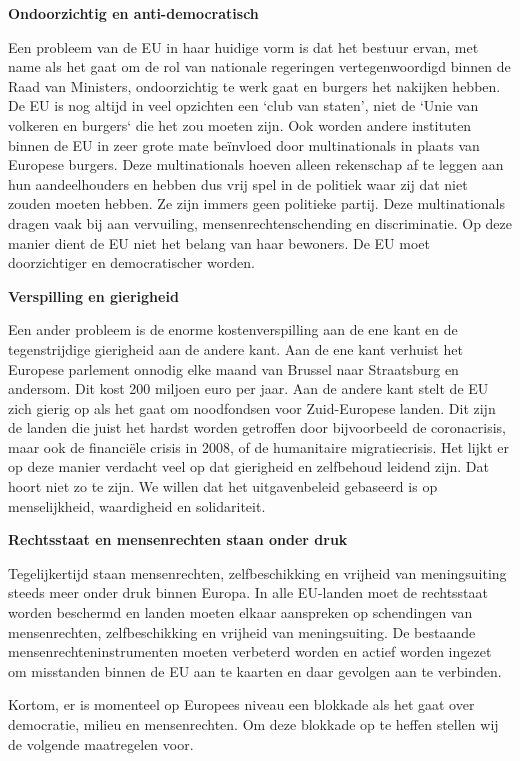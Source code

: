 \textbf{Ondoorzichtig en anti-democratisch}

Een probleem van de EU in haar huidige vorm is dat het bestuur ervan,
met name als het gaat om de rol van nationale regeringen
vertegenwoordigd binnen de Raad van Ministers, ondoorzichtig te werk
gaat en burgers het nakijken hebben. De EU is nog altijd in veel
opzichten een `club van staten', niet de `Unie van volkeren en burgers`
die het zou moeten zijn. Ook worden andere instituten binnen de EU in
zeer grote mate beïnvloed door multinationals in plaats van Europese
burgers. Deze multinationals hoeven alleen rekenschap af te leggen aan
hun aandeelhouders en hebben dus vrij spel in de politiek waar zij dat
niet zouden moeten hebben. Ze zijn immers geen politieke partij. Deze
multinationals dragen vaak bij aan vervuiling, mensenrechtenschending en
discriminatie. Op deze manier dient de EU niet het belang van haar
bewoners. De EU moet doorzichtiger en democratischer worden.

\textbf{Verspilling en gierigheid}

Een ander probleem is de enorme kostenverspilling aan de ene kant en de
tegenstrijdige gierigheid aan de andere kant. Aan de ene kant verhuist
het Europese parlement onnodig elke maand van Brussel naar Straatsburg
en andersom. Dit kost 200 miljoen euro per jaar. Aan de andere kant
stelt de EU zich gierig op als het gaat om noodfondsen voor
Zuid-Europese landen. Dit zijn de landen die juist het hardst worden
getroffen door bijvoorbeeld de coronacrisis, maar ook de financiële
crisis in 2008, of de humanitaire migratiecrisis. Het lijkt er op deze
manier verdacht veel op dat gierigheid en zelfbehoud leidend zijn. Dat
hoort niet zo te zijn. We willen dat het uitgavenbeleid gebaseerd is op
menselijkheid, waardigheid en solidariteit.

\textbf{Rechtsstaat en mensenrechten staan onder druk}

Tegelijkertijd staan mensenrechten, zelfbeschikking en vrijheid van
meningsuiting steeds meer onder druk binnen Europa. In alle EU-landen
moet de rechtsstaat worden beschermd en landen moeten elkaar aanspreken
op schendingen van mensenrechten, zelfbeschikking en vrijheid van
meningsuiting. De bestaande mensenrechteninstrumenten moeten verbeterd
worden en actief worden ingezet om misstanden binnen de EU aan te
kaarten en daar gevolgen aan te verbinden.

Kortom, er is momenteel op Europees niveau een blokkade als het gaat
over democratie, milieu en mensenrechten. Om deze blokkade op te heffen
stellen wij de volgende maatregelen voor.

